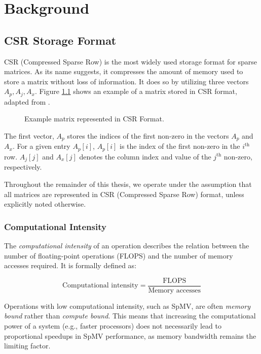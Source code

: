 \chapter{Background}

\section{CSR Storage Format}
CSR (Compressed Sparse Row) is the most widely used storage format for sparse matrices. As its name suggests, it compresses the amount of memory used to store a matrix without loss of information. It does so by utilizing three vectors \(A_{p}, A_{j}, A_{x}\). Figure \ref{fig:csrformat} shows an example of a matrix stored in CSR format, adapted from \cite{gupta2024gamgi}.

\begin{figure}[ht]
    \centering
    \caption{Example matrix represented in CSR Format.}
    \label{fig:csrformat}
\end{figure}

The first vector, \(A_{p}\) stores the indices of the first non-zero in the vectors \(A_{p}\) and \(A_{x}\). For a given entry \(A_{p}[i]\), \(A_{p}[i]\) is the index of the first non-zero in the \(i^{\text{th}}\) row. \(A_{j}[j]\) and \(A_{x}[j]\) denotes the column index and value of the \(j^{\text{th}}\) non-zero, respectively.
\medskip

Throughout the remainder of this thesis, we operate under the assumption that all matrices are represented in CSR (Compressed Sparse Row) format, unless explicitly noted otherwise.


\subsection{Computational Intensity}

The \textit{computational intensity} of an operation describes the relation between the number of floating-point operations (FLOPS) and the number of memory accesses required. It is formally defined as:

\begin{equation}
    \text{Computational intensity} = \frac{\text{FLOPS}}{\text{Memory accesses}}
    \label{eq:computationaldensity}
\end{equation}

Operations with low computational intensity, such as SpMV, are often \textit{memory bound} rather than \textit{compute bound}. This means that increasing the computational power of a system (e.g., faster processors) does not necessarily lead to proportional speedups in SpMV performance, as memory bandwidth remains the limiting factor.

